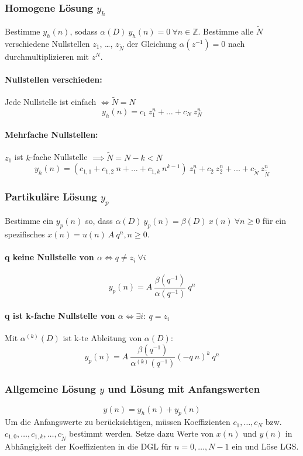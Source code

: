\documentclass[10pt,a4paper]{article}
\begin{document}
\subsubsection*{Homogene Lösung $y_h$}
Bestimme $y_h(n)$, sodass $\alpha(D) ~ y_h(n) = 0 ~ \forall n \in \mathbb Z$. Bestimme alle $\tilde N$ verschiedene Nullstellen $z_1$, …, $z_{\tilde N}$ der Gleichung $\alpha(z^{-1}) = 0$ nach durchmultiplizieren mit $z^N$.

\paragraph{Nullstellen verschieden:} Jede Nullstelle ist einfach $\Leftrightarrow \tilde N = N$
\[
	y_h(n) = c_1 ~ z_1^n + … + c_N ~ z_N^n
\]

\paragraph{Mehrfache Nullstellen:} $z_1$ ist $k$-fache Nullstelle $\implies \tilde N = N - k < N$
\[
	y_h(n) = \left(c_{1,1} + c_{1,2} ~ n + … + c_{1,k} ~ n^{k-1}\right) ~ z_1^n + c_2 ~ z_2^n + … + c_{\tilde N} ~ z_{\tilde N}^n
\]

\subsubsection*{Partikuläre Lösung $y_p$}
Bestimme ein $y_p(n)$ so, dass $\alpha(D) ~ y_p(n) = \beta(D) ~ x(n) ~ \forall n \geq 0$ für ein spezifisches $x(n) = u(n) ~ A ~ q^n, n \geq 0$.

\paragraph{q keine Nullstelle von $\alpha \Leftrightarrow q \neq z_i ~ \forall i$}
\[
	y_p(n) = A ~ \frac{\beta(q^{-1})}{\alpha(q^{-1})} ~ q^n
\]
\paragraph{q ist k-fache Nullstelle von $\alpha \Leftrightarrow \exists i: ~ q = z_i$} Mit $\alpha^{(k)}(D)$ ist k-te Ableitung von $\alpha(D)$:
\[
	y_p(n) = A ~ \frac{\beta(q^{-1})}{\alpha^{(k)}(q^{-1})} (-q ~ n)^k ~ q^n
\]

\subsubsection*{Allgemeine Lösung $y$ und Lösung mit Anfangswerten}
\[
	y(n) = y_h(n) + y_p(n)
\]
Um die Anfangswerte zu berücksichtigen, müssen Koeffizienten $c_1, …, c_N$ bzw. $c_{1,0}, …, c_{1,k}, …, c_{\tilde N}$ bestimmt werden. Setze dazu Werte von $x(n)$ und $y(n)$ in Abhängigkeit der Koeffizienten in die DGL für $n = 0, …, N - 1$ ein und Löse LGS.
\end{document}
